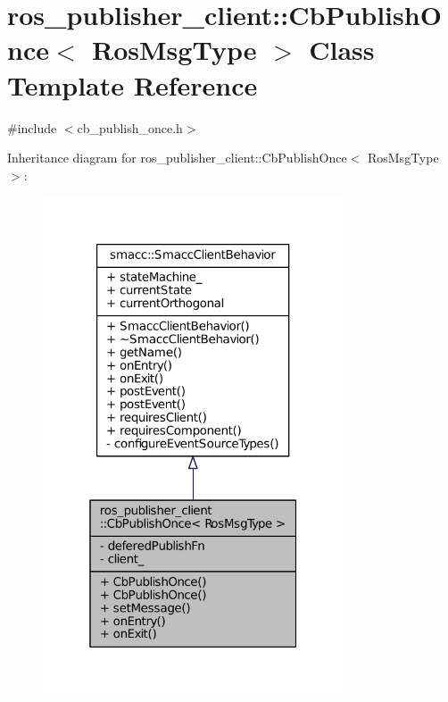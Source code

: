 \hypertarget{classros__publisher__client_1_1CbPublishOnce}{}\section{ros\+\_\+publisher\+\_\+client\+:\+:Cb\+Publish\+Once$<$ Ros\+Msg\+Type $>$ Class Template Reference}
\label{classros__publisher__client_1_1CbPublishOnce}


{\ttfamily \#include $<$cb\+\_\+publish\+\_\+once.\+h$>$}



Inheritance diagram for ros\+\_\+publisher\+\_\+client\+:\+:Cb\+Publish\+Once$<$ Ros\+Msg\+Type $>$\+:
\nopagebreak
\begin{figure}[H]
\begin{center}
\leavevmode
\includegraphics[width=253pt]{classros__publisher__client_1_1CbPublishOnce__inherit__graph}
\end{center}
\end{figure}


